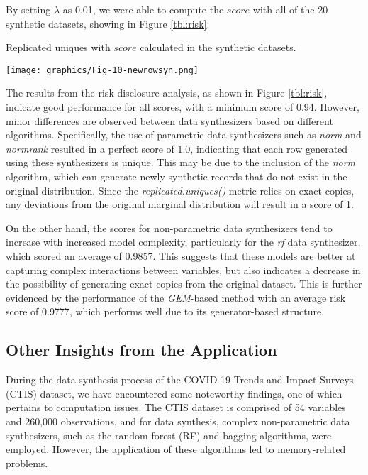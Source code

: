 By setting $\lambda$ as 0.01, we were able to compute the $score$ with all of the 20 synthetic datasets, showing in Figure \ref{tbl:risk}.
\begin{table}[H]
    \centering
    \caption{Replicated uniques with $score$ calculated in the synthetic datasets.}
    \label{tbl:risk}
    \texttt{[image: graphics/Fig-10-newrowsyn.png]}    
\end{table}
The results from the risk disclosure analysis, as shown in Figure \ref{tbl:risk}, indicate good performance for all scores, with a minimum score of 0.94. However, minor differences are observed between data synthesizers based on different algorithms. Specifically, the use of parametric data synthesizers such as \textit{norm} and \textit{normrank} resulted in a perfect score of 1.0, indicating that each row generated using these synthesizers is unique. This may be due to the inclusion of the \textit{norm} algorithm, which can generate newly synthetic records that do not exist in the original distribution. Since the \textit{replicated.uniques()} metric relies on exact copies, any deviations from the original marginal distribution will result in a score of 1.

On the other hand, the scores for non-parametric data synthesizers tend to increase with increased model complexity, particularly for the \textit{rf} data synthesizer, which scored an average of 0.9857. This suggests that these models are better at capturing complex interactions between variables, but also indicates a decrease in the possibility of generating exact copies from the original dataset. This is further evidenced by the performance of the \textit{GEM}-based method with an average risk score of 0.9777, which performs well due to its generator-based structure.



\subsection{Other Insights from the Application}
\label{subsec:findings}
During the data synthesis process of the COVID-19 Trends and Impact Surveys (CTIS) dataset, we have encountered some noteworthy findings, one of which pertains to computation issues. The CTIS dataset is comprised of 54 variables and 260,000 observations, and for data synthesis, complex non-parametric data synthesizers, such as the random forest (RF) and bagging algorithms, were employed. However, the application of these algorithms led to memory-related problems.

